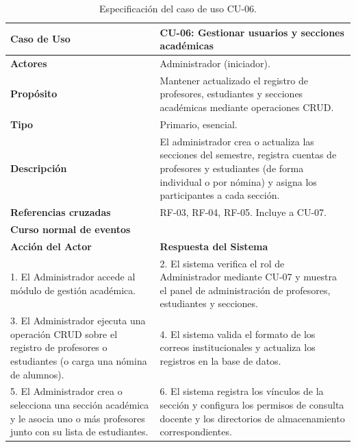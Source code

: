 \begin{table}[H]
\centering
\caption{Especificación del caso de uso CU-06.}
\label{tab:cu_06}
\small
\begin{tabular}{p{} p{}}
\toprule
\textbf{Caso de Uso} & \textbf{CU-06: Gestionar usuarios y secciones académicas} \\
\midrule
\textbf{Actores} & Administrador (iniciador). \\
\textbf{Propósito} & Mantener actualizado el registro de profesores, estudiantes y secciones académicas mediante operaciones CRUD. \\
\textbf{Tipo} & Primario, esencial. \\
\textbf{Descripción} & El administrador crea o actualiza las secciones del semestre, registra cuentas de profesores y estudiantes (de forma individual o por nómina) y asigna los participantes a cada sección. \\
\textbf{Referencias cruzadas} & RF-03, RF-04, RF-05. Incluye a CU-07. \\
\midrule
\multicolumn{2}{l}{\textbf{Curso normal de eventos}} \\
\midrule
\textbf{Acción del Actor} & \textbf{Respuesta del Sistema} \\
\midrule
1. El Administrador accede al módulo de gestión académica. & 2. El sistema verifica el rol de Administrador mediante CU-07 y muestra el panel de administración de profesores, estudiantes y secciones. \\
3. El Administrador ejecuta una operación CRUD sobre el registro de profesores o estudiantes (o carga una nómina de alumnos). & 4. El sistema valida el formato de los correos institucionales y actualiza los registros en la base de datos. \\
5. El Administrador crea o selecciona una sección académica y le asocia uno o más profesores junto con su lista de estudiantes. & 6. El sistema registra los vínculos de la sección y configura los permisos de consulta docente y los directorios de almacenamiento correspondientes. \\
\bottomrule
\end{tabular}
\end{table}

